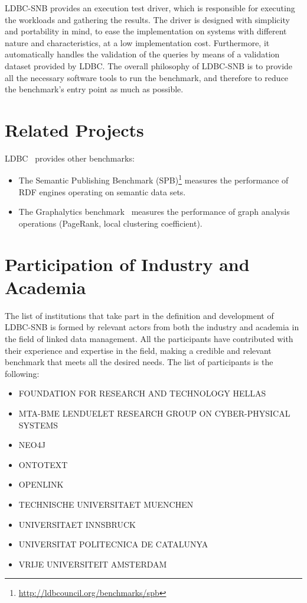 LDBC-SNB provides an execution test driver, which is responsible for executing
the workloads and gathering the results. The driver is designed with simplicity
and portability in mind, to ease the implementation on systems with different
nature and characteristics, at a low implementation cost. Furthermore, it
automatically handles the validation of the queries by means of a validation
dataset provided by LDBC.  The overall philosophy of LDBC-SNB is to provide all
the necessary software tools to run the benchmark, and therefore to reduce the
benchmark's entry point as much as possible.

\section{Related Projects}

LDBC~\cite{DBLP:journals/sigmod/AnglesBLF0ENMKT14} provides other benchmarks:

\begin{itemize}
	\item The Semantic Publishing Benchmark (SPB)\footnote{\url{http://ldbcouncil.org/benchmarks/spb}} measures the performance of RDF engines operating on semantic data sets.
	\item The Graphalytics benchmark~\cite{DBLP:journals/pvldb/IosupHNHPMCCSAT16} measures the performance of graph analysis operations (\eg PageRank, local clustering coefficient).
\end{itemize}

\section{Participation of Industry and Academia}

The list of institutions that take part in the definition and development
of LDBC-SNB is formed by relevant actors from both the industry and academia in
the field of linked data management. All the participants have contributed with
their experience and expertise in the field, making a credible and relevant
benchmark that meets all the desired needs. The list of participants is the
following:

\begin{itemize}
    \item FOUNDATION FOR RESEARCH AND TECHNOLOGY HELLAS
    \item MTA-BME LENDUELET RESEARCH GROUP ON CYBER-PHYSICAL SYSTEMS
    \item NEO4J
    \item ONTOTEXT
    \item OPENLINK
    \item TECHNISCHE UNIVERSITAET MUENCHEN
    \item UNIVERSITAET INNSBRUCK
    \item UNIVERSITAT POLITECNICA DE CATALUNYA
    \item VRIJE UNIVERSITEIT AMSTERDAM
\end{itemize}

